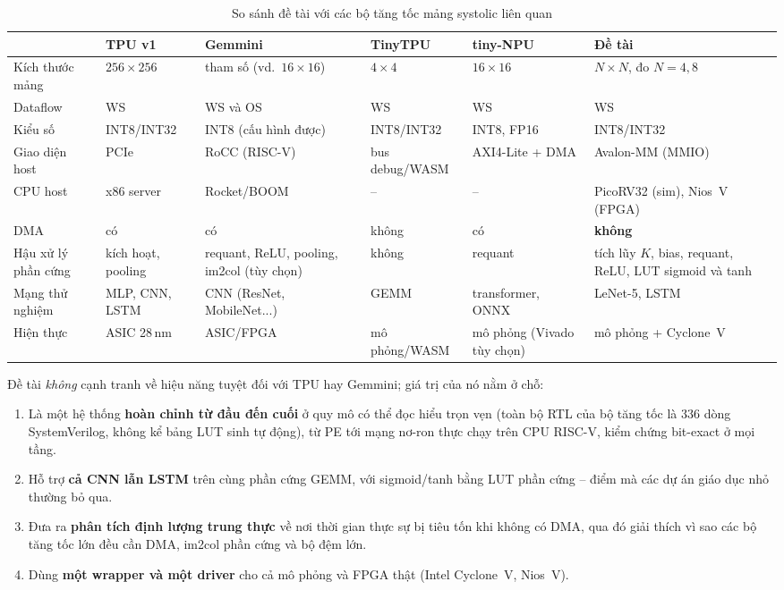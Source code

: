 \begin{table}[H]
  \centering
  \caption{So sánh đề tài với các bộ tăng tốc mảng systolic liên quan}
  \label{tab:related}
  \footnotesize
  \setlength{\tabcolsep}{3pt}
  \begin{tabularx}{\linewidth}{l>{\raggedright}X>{\raggedright}X>{\raggedright}X>{\raggedright}X>{\raggedright\arraybackslash}X}
    \toprule
     & TPU v1 \cite{jouppi2017tpu} & Gemmini \cite{genc2021gemmini} & TinyTPU \cite{tinytpu} & tiny-NPU \cite{tinynpu} & \textbf{Đề tài} \\
    \midrule
    Kích thước mảng & $256\times256$ & tham số (vd.\ $16\times16$) & $4\times4$ & $16\times16$ & $N\times N$, đo $N=4,8$ \\
    Dataflow & WS & WS và OS & WS & WS & WS \\
    Kiểu số & INT8/INT32 & INT8 (cấu hình được) & INT8/INT32 & INT8, FP16 & INT8/INT32 \\
    Giao diện host & PCIe & RoCC (RISC-V) & bus debug/WASM & AXI4-Lite + DMA & Avalon-MM (MMIO) \\
    CPU host & x86 server & Rocket/BOOM & -- & -- & PicoRV32 (sim), Nios~V (FPGA) \\
    DMA & có & có & không & có & \textbf{không} \\
    Hậu xử lý phần cứng & kích hoạt, pooling & requant, ReLU, pooling, im2col (tùy chọn) & không & requant & tích lũy $K$, bias, requant, ReLU, LUT sigmoid và tanh \\
    Mạng thử nghiệm & MLP, CNN, LSTM & CNN (ResNet, MobileNet...) & GEMM & transformer, ONNX & LeNet-5, LSTM \\
    Hiện thực & ASIC 28\,nm & ASIC/FPGA & mô phỏng/WASM & mô phỏng (Vivado tùy chọn) & mô phỏng + Cyclone~V \\
    \bottomrule
  \end{tabularx}
\end{table}

Đề tài \emph{không} cạnh tranh về hiệu năng tuyệt đối với TPU hay Gemmini; giá trị của nó nằm ở chỗ:
\begin{enumerate}
  \item Là một hệ thống \textbf{hoàn chỉnh từ đầu đến cuối} ở quy mô có thể đọc hiểu trọn vẹn (toàn bộ RTL của bộ tăng tốc là 336 dòng SystemVerilog, không kể bảng LUT sinh tự động), từ PE tới mạng nơ-ron thực chạy trên CPU RISC-V, kiểm chứng bit-exact ở mọi tầng.
  \item Hỗ trợ \textbf{cả CNN lẫn LSTM} trên cùng phần cứng GEMM, với sigmoid/tanh bằng LUT phần cứng -- điểm mà các dự án giáo dục nhỏ thường bỏ qua.
  \item Đưa ra \textbf{phân tích định lượng trung thực} về nơi thời gian thực sự bị tiêu tốn khi không có DMA, qua đó giải thích vì sao các bộ tăng tốc lớn đều cần DMA, im2col phần cứng và bộ đệm lớn.
  \item Dùng \textbf{một wrapper và một driver} cho cả mô phỏng và FPGA thật (Intel Cyclone~V, Nios~V).
\end{enumerate}
